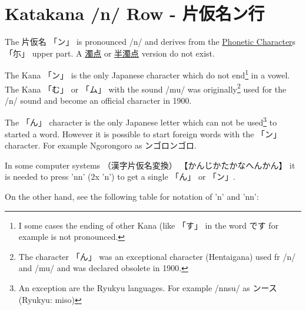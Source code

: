 \section{Katakana /n/ Row - 片仮名ン行}\label{sec:KatakanaNrow}


 The  片仮名 {「ン」} is pronounced  /n/ and  derives from the
\hyperref[sec:PhoneticCharacter]{Phonetic Character}s {「尓」} upper part.  A
\hyperref[sec:Dakuten]{濁点} or \hyperref[sec:Handakuten]{半濁点} version do
not exist.


The Kana {「ン」}  is the only Japanese character which do not end\footnote{ I
some cases the ending of other Kana (like {「す」} in the word {です} for
example is not pronounced.} in a vowel. The Kana {「む」} or {「ム」} with the
sound /mu/ was originally\footnote{ The character {「ん」} was an exceptional
character (Hentaigana) used fr /n/ and /mu/ and was declared obsolete in 1900.}
used for the /n/ sound and become an official character in 1900. 

The {「ん」} character is the only Japanese letter which can not be
used\footnote{An exception are the Ryukyu languages. For example /nnsu/ as
ンース (Ryukyu: miso) } to started a word. However it is possible to start
foreign words with the {「ン」} character. For example Ngorongoro as
ンゴロンゴロ. 

In some computer systems {（漢字片仮名変換）} {【かんじかたかなへんかん】} it
is needed to press 'nn' (2x 'n') to get a single {「ん」} or {「ン」}.

On the other hand, see the following table for notation of 'n' and 'nn':
\bigskip





